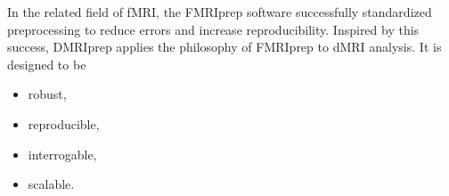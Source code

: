 \documentclass[a0paper,portrait,fontscale=0.395]{baposter}
\begin{document}
\begin{poster}
{\noindent In the related field of fMRI, the FMRIprep software\cite{esteban2019fmriprep} successfully standardized preprocessing to reduce errors and increase reproducibility. Inspired by this success, DMRIprep applies the philosophy of FMRIprep to dMRI analysis. It is designed to be
\vspace{-0.5em}
\begin{multicols}{2}
\begin{itemize}[nosep]
    \item robust,
    \item reproducible,
    \item interrogable,
    \item scalable.
\end{itemize}
\end{multicols}
}


\end{poster}
\end{document}
